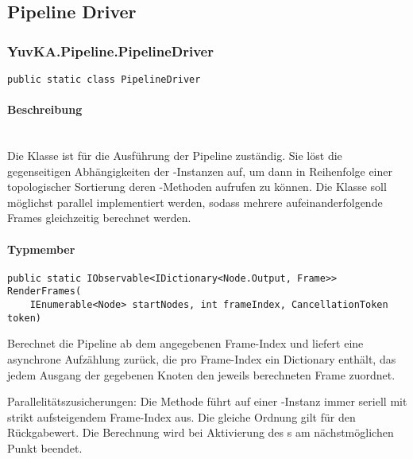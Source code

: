 \subsection{Pipeline Driver}

\subsubsection{YuvKA.Pipeline.PipelineDriver}

\begin{verbatim}
public static class PipelineDriver
\end{verbatim}

\paragraph{Beschreibung}~\\
Die Klasse  ist für die Ausführung der Pipeline zuständig. Sie löst die gegenseitigen Abhängigkeiten der -Instanzen auf, um dann in Reihenfolge einer topologischer Sortierung deren -Methoden aufrufen zu können.
Die Klasse soll möglichst parallel implementiert werden, sodass mehrere aufeinanderfolgende Frames gleichzeitig berechnet werden.

\paragraph{Typmember}
\begin{itemize}

	\begin{verbatim}
public static IObservable<IDictionary<Node.Output, Frame>> RenderFrames(
    IEnumerable<Node> startNodes, int frameIndex, CancellationToken token)
    \end{verbatim}
	Berechnet die Pipeline ab dem angegebenen Frame-Index und liefert eine asynchrone Aufzählung zurück, die pro Frame-Index ein Dictionary enthält, das jedem Ausgang der gegebenen Knoten  den jeweils berechneten Frame zuordnet.

    Parallelitätszusicherungen: Die Methode führt auf einer -Instanz  immer seriell mit strikt aufsteigendem Frame-Index aus. Die gleiche Ordnung gilt für den Rückgabewert. Die Berechnung wird bei Aktivierung des s am nächstmöglichen Punkt beendet.

\end{itemize}
